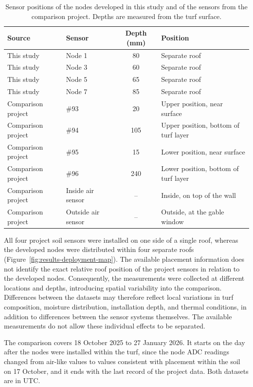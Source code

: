 \begin{table}[htbp]
\centering
\caption{Sensor positions of the nodes developed in this study and of the sensors from the comparison project. Depths are measured from the turf surface.}
\label{tab:cmp-layout}
\small
\begin{tabularx}{\textwidth}{l l c >{\raggedright\arraybackslash}X}
\hline
Source & Sensor & Depth (mm) & Position \\
\hline
This study & Node 1 & 80 & Separate roof \\
This study & Node 3 & 60 & Separate roof \\
This study & Node 5 & 65 & Separate roof \\
This study & Node 7 & 85 & Separate roof \\
Comparison project & \#93 & 20 & Upper position, near surface \\
Comparison project & \#94 & 105 & Upper position, bottom of turf layer \\
Comparison project & \#95 & 15 & Lower position, near surface \\
Comparison project & \#96 & 240 & Lower position, bottom of turf layer \\
Comparison project & Inside air sensor & -- & Inside, on top of the wall \\
Comparison project & Outside air sensor & -- & Outside, at the gable window \\
\hline
\end{tabularx}
\end{table}

All four project soil sensors were installed on one side of a single roof, whereas the developed nodes were distributed within four separate roofs (Figure~\ref{fig:results-deployment-map}). The available placement information does not identify the exact relative roof position of the project sensors in relation to the developed nodes. Consequently, the measurements were collected at different locations and depths, introducing spatial variability into the comparison. Differences between the datasets may therefore reflect local variations in turf composition, moisture distribution, installation depth, and thermal conditions, in addition to differences between the sensor systems themselves. The available measurements do not allow these individual effects to be separated.

The comparison covers 18 October 2025 to 27 January 2026. It starts on the day after the nodes were installed within the turf, since the node ADC readings changed from air-like values to values consistent with placement within the soil on 17 October, and it ends with the last record of the project data. Both datasets are in UTC.

